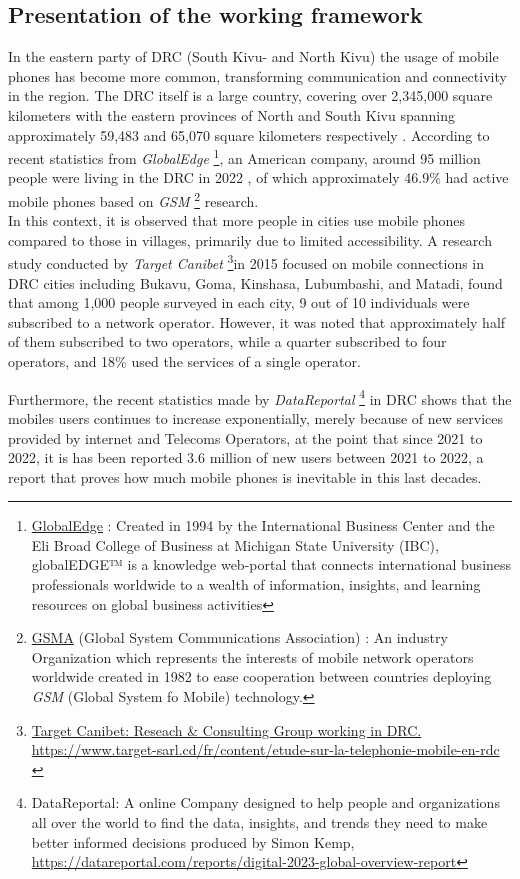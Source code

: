 \documentclass[12pt,a4paper]{report}
\begin{document}
		\subsection{Presentation of the working framework}  
		In the eastern party of DRC (South Kivu- and North Kivu) the usage of mobile phones has become more common, transforming communication and connectivity in the region. 
	The DRC itself is a large country, covering over 2,345,000 square kilometers with the eastern provinces of North and South Kivu spanning approximately 59,483 and 65,070 square kilometers respectively \cite{giswatch2018}. According to recent statistics from \textit{GlobalEdge} \footnote{ \href{https://globaledge.msu.edu/}{GlobalEdge}  : Created in 1994 by the International Business Center and the Eli Broad College of Business at Michigan State University (IBC), globalEDGE™ is a knowledge web-portal that connects international business professionals worldwide to a wealth of information, insights, and learning resources on global business activities}, an American company, around 95 million people were living in the DRC in 2022 \cite{monusco2015}, of which approximately 46.9\% had active mobile phones based on \textit{GSM} \footnote{\href{https://www.gsma.com/aboutus/}{GSMA}  (Global System Communications Association) : An industry Organization which represents the interests of mobile network operators worldwide created in 1982 to ease cooperation between countries deploying \textit{GSM} (Global System fo Mobile) technology.} research. \\ 
		
		
		In this context, it is observed that more people in cities use mobile phones compared to those in villages, primarily due to limited accessibility. A research study conducted by \textit{Target Canibet} \footnote{\href{https://www.target-sarl.cd/fr/content/etude-sur-la-telephonie-mobile-en-rdc}{Target Canibet: Reseach \& Consulting Group working in DRC. \url{https://www.target-sarl.cd/fr/content/etude-sur-la-telephonie-mobile-en-rdc} }}in 2015 focused on mobile connections in DRC cities including Bukavu, Goma, Kinshasa, Lubumbashi, and Matadi, found that among 1,000 people surveyed in each city, 9 out of 10 individuals were subscribed to a network operator. However, it was noted that approximately half of them subscribed to two operators, while a quarter subscribed to four operators, and 18\% used the services of a single operator.  
		
		Furthermore, the recent statistics made by \textit{DataReportal} \footnote{DataReportal: A online Company designed to help people and organizations all over the world to find the data, insights, and trends they need to make better informed decisions produced by Simon Kemp, \url{https://datareportal.com/reports/digital-2023-global-overview-report}}  in DRC shows that the mobiles users continues to increase exponentially, merely because of new services provided by internet and Telecoms Operators, at the point that since 2021 to 2022, it is has been reported 3.6 million of new users between 2021 to 2022, a report that proves how much mobile phones is inevitable in this last decades.
			
\end{document}
